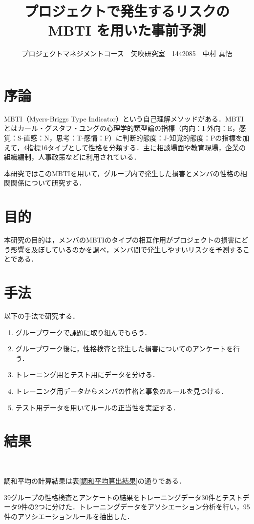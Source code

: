 \documentclass[uplatex,twocolumn,dvipdfmx]{jsarticle}
\title{\vspace{-5mm}\fontsize{14pt}{0pt}\selectfont プロジェクトで発生するリスクのMBTI を用いた事前予測}
\author{\normalsize プロジェクトマネジメントコース　矢吹研究室　1442085　中村 真悟}
\date{}
\begin{document}
\fontsize{10.5pt}{\baselineskip}\selectfont
\maketitle





\section{序論}\label{序論}
MBTI（Myers-Briggs Type Indicator）という自己理解メソッドがある．MBTIとはカール・グスタフ・ユングの心理学的類型論の指標（内向：I-外向：E，感覚：S-直感：N，思考：T-感情：F）に判断的態度：J-知覚的態度：Pの指標を加えて，4指標16タイプとして性格を分類する．主に相談場面や教育現場，企業の組織編制，人事政策などに利用されている\cite{110001230195}．


本研究ではこのMBTIを用いて，グループ内で発生した損害とメンバの性格の相関関係について研究する．

\section{目的}

本研究の目的は，メンバのMBTIのタイプの相互作用がプロジェクトの損害にどう影響を及ぼしているのかを調べ，メンバ間で発生しやすいリスクを予測することである．
\section{手法}

以下の手法で研究する．
\begin{enumerate}
\item グループワークで課題に取り組んでもらう．
\item グループワーク後に，性格検査と発生した損害についてのアンケートを行う．
\item トレーニング用とテスト用にデータを分ける．
\item トレーニング用データからメンバの性格と事象のルールを見つける．
\item テスト用データを用いてルールの正当性を実証する．
\end{enumerate}
\section{結果}　

調和平均の計算結果は表\ref{調和平均算出結果}の通りである．

39グループの性格検査とアンケートの結果をトレーニングデータ30件とテストデータ9件の2つに分けた．トレーニングデータをアソシエーション分析を行い，95件のアソシエーションルールを抽出した．
\end{document}
